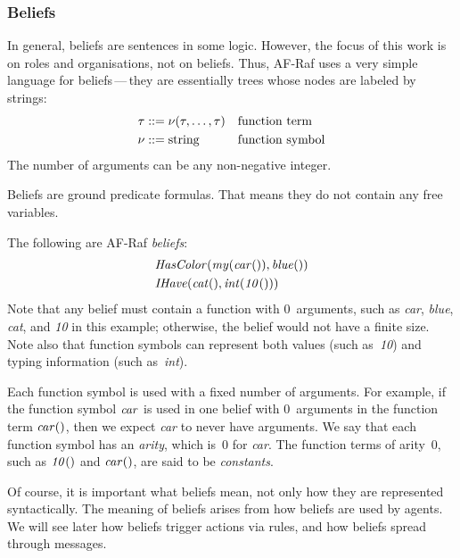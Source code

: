 \documentclass[a4paper,12pt,oneside,fleqn]{book} %
\begin{document}
{\subsubsection{Beliefs}

In general, beliefs are sentences in some logic.  However, the focus of
this work is on roles and organisations, not on beliefs.  Thus, AF-Raf uses
a very simple language for beliefs\,---\,they are essentially trees whose
nodes are labeled by strings: \begin{align} \tau &::= \nu(\tau,\ldots,\tau)
&& \text{function term} \\ \nu  &::= {\rm string} &&\text{function symbol}
\end{align} The number of arguments can be any non-negative integer.

Beliefs are ground predicate formulas. That means they do not contain any
free variables.

\begin{example}
The following are AF-Raf \emph{beliefs}:
\begin{align}
&{\it HasColor}({\it my}({\it car}()), {\it blue}()) \\
&{\it IHave}({\it cat}(), {\it int}({\it 10}()))
\end{align}
Note that any belief must contain a function with $0$~arguments, such as
{\it car}, {\it blue}, {\it cat}, and {\it 10\/} in this example;
otherwise, the belief would not have a finite size.  Note also that
function symbols can represent both values (such as~{\it 10\/}) and typing
information (such as~{\it int\/}).
\end{example}

Each function symbol is used with a fixed number of arguments.  For
example, if the function symbol ${\it car}$ is used in one belief with
$0$~arguments in the function term ${\it car}()$, then we expect {\it
car\/} to never have arguments.  We say that each function symbol has an
\emph{arity}, which is~$0$ for {\it car}.  The function terms of arity~$0$,
such as ${\it 10}()$ and ${\it car}()$, are said to be \emph{constants}.

\begin{remark}
Of course, it is important what beliefs mean, not only how they are
represented syntactically.  The meaning of beliefs arises from how beliefs
are used by agents.  We will see later how beliefs trigger actions via
rules, and how beliefs spread through messages.
\end{remark}

}
\end{document}
